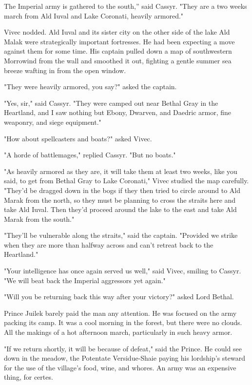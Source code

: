 \clearpage
{}

\dropcap The Imperial army is gathered to the south,'' said Cassyr. "They are a two weeks march from Ald Iuval and Lake Coronati, heavily armored."

Vivec nodded. Ald Iuval and its sister city on the other side of the lake Ald Malak were strategically important fortresses. He had been expecting a move against them for some time. His captain pulled down a map of southwestern Morrowind from the wall and smoothed it out, fighting a gentle summer sea breeze wafting in from the open window.

"They were heavily armored, you say?" asked the captain.

"Yes, sir," said Cassyr. "They were camped out near Bethal Gray in the Heartland, and I saw nothing but Ebony, Dwarven, and Daedric armor, fine weaponry, and siege equipment."

"How about spellcasters and boats?" asked Vivec.

"A horde of battlemages," replied Cassyr. "But no boats."

"As heavily armored as they are, it will take them at least two weeks, like you said, to get from Bethal Gray to Lake Coronati," Vivec studied the map carefully. "They'd be dragged down in the bogs if they then tried to circle around to Ald Marak from the north, so they must be planning to cross the straits here and take Ald Iuval. Then they'd proceed around the lake to the east and take Ald Marak from the south."

"They'll be vulnerable along the straits," said the captain. "Provided we strike when they are more than halfway across and can't retreat back to the Heartland."

"Your intelligence has once again served us well," said Vivec, smiling to Cassyr. "We will beat back the Imperial aggressors yet again."

"Will you be returning back this way after your victory?" asked Lord Bethal.

Prince Juilek barely paid the man any attention. He was focused on the army packing its camp. It was a cool morning in the forest, but there were no clouds. All the makings of a hot afternoon march, particularly in such heavy armor.

"If we return shortly, it will be because of defeat," said the Prince. He could see down in the meadow, the Potentate Versidue-Shaie paying his lordship's steward for the use of the village's food, wine, and whores. An army was an expensive thing, for certes.

